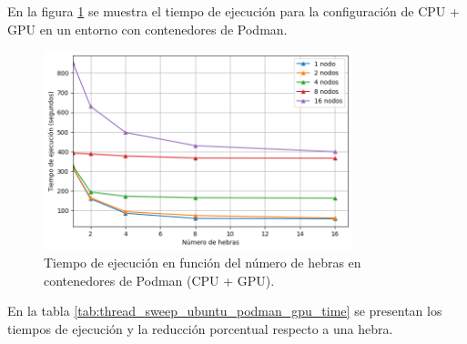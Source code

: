 En la figura \ref{fig:thread_sweep_ubuntu_podman_gpu_time} se muestra el tiempo de ejecución para la configuración de CPU + GPU en un entorno con contenedores de Podman.

\begin{figure}[H]
    \centering
    \includegraphics[width=0.8\textwidth]{imagenes/cap5/thread_sweep_ubuntu_podman_gpu_time.png}
    \caption{Tiempo de ejecución en función del número de hebras en contenedores de Podman (CPU + GPU).}
    \label{fig:thread_sweep_ubuntu_podman_gpu_time}
\end{figure}

En la tabla \ref{tab:thread_sweep_ubuntu_podman_gpu_time} se presentan los tiempos de ejecución y la reducción porcentual respecto a una hebra.

